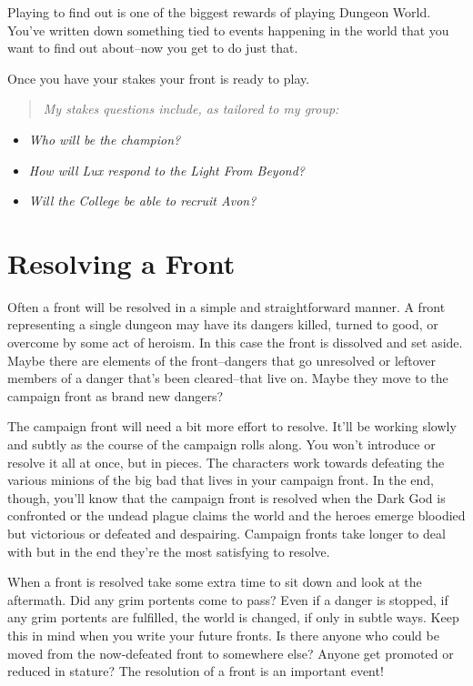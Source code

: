  Playing to find out is one of the biggest rewards of playing Dungeon World. You've written down something tied to events happening in the world that you want to find out about--now you get to do just that.


 Once you have your stakes your front is ready to play.


\begin{quote}
\emph{My stakes questions include, as tailored to my group:}
\end{quote}
\begin{itemize}
\item \emph{Who will be the champion?}
\item \emph{How will Lux respond to the Light From Beyond?}
\item \emph{Will the College be able to recruit Avon?}

\end{itemize}
\section{Resolving a Front}


 Often a front will be resolved in a simple and straightforward manner. A front representing a single dungeon may have its dangers killed, turned to good, or overcome by some act of heroism. In this case the front is dissolved and set aside. Maybe there are elements of the front--dangers that go unresolved or leftover members of a danger that's been cleared--that live on. Maybe they move to the campaign front as brand new dangers?


 The campaign front will need a bit more effort to resolve. It'll be working slowly and subtly as the course of the campaign rolls along. You won't introduce or resolve it all at once, but in pieces. The characters work towards defeating the various minions of the big bad that lives in your campaign front. In the end, though, you'll know that the campaign front is resolved when the Dark God is confronted or the undead plague claims the world and the heroes emerge bloodied but victorious or defeated and despairing. Campaign fronts take longer to deal with but in the end they're the most satisfying to resolve.


 When a front is resolved take some extra time to sit down and look at the aftermath. Did any grim portents come to pass? Even if a danger is stopped, if any grim portents are fulfilled, the world is changed, if only in subtle ways. Keep this in mind when you write your future fronts. Is there anyone who could be moved from the now-defeated front to somewhere else? Anyone get promoted or reduced in stature? The resolution of a front is an important event!


